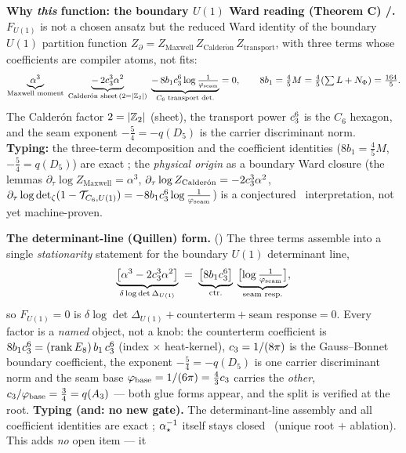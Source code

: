 \par\smallskip\noindent\textbf{Why \emph{this} function: the boundary $U(1)$ Ward reading (Theorem C) \mE/\mC.}
$F_{U(1)}$ is not a chosen ansatz but the reduced Ward identity of the boundary $U(1)$ partition function
$Z_{\partial}=Z_{\mathrm{Maxwell}}\,Z_{\mathrm{Calder\acute on}}\,Z_{\mathrm{transport}}$, with three terms
whose coefficients are compiler atoms, not fits:
\[
  \underbrace{\alpha^3}_{\text{Maxwell moment}}\;
  \underbrace{-\,2c_3^3\alpha^2}_{\text{Calder\'on sheet}\,(2=|\mathbb{Z}_2|)}\;
  \underbrace{-\,8b_1c_3^6\log\tfrac1{\varphi_{\mathrm{seam}}}}_{\text{$C_6$ transport det.}}=0,\qquad
  8b_1=\tfrac45 M=\tfrac45(\textstyle\sum L+N_\Phi)=\tfrac{164}{5}.
\]
The Calder\'on factor $2=|\mathbb{Z}_2|$ (sheet), the transport power $c_3^6$ is the $C_6$ hexagon, and the
seam exponent $-\tfrac54=-q(D_5)$ is the carrier discriminant norm. \textbf{Typing:} the three-term
decomposition and the coefficient identities ($8b_1=\tfrac45 M$, $-\tfrac54=q(D_5)$) are exact \mE; the
\emph{physical origin} as a boundary Ward closure (the lemmas $\partial_\tau\log Z_{\mathrm{Maxwell}}=\alpha^3$,
$\partial_\tau\log Z_{\mathrm{Calder\acute on}}=-2c_3^3\alpha^2$, $\partial_\tau\log\det\nolimits_\zeta(1-\mathcal T_{C_6,U(1)})=-8b_1c_3^6\log\tfrac1{\varphi_{\mathrm{seam}}}$)
is a conjectured \mC\ interpretation, not yet machine-proven. 
\par\smallskip
\noindent\textbf{The determinant-line (Quillen) form.} ()
The three terms assemble into a single \emph{stationarity} statement for the boundary $U(1)$ determinant line,
\[
  \underbrace{\bigl[\alpha^3-2c_3^3\alpha^2\bigr]}_{\delta\log\det\Delta_{U(1)}}
  \;=\;\underbrace{\bigl[8b_1c_3^6\bigr]}_{\text{ctr.}}\;
  \underbrace{\bigl[\log\tfrac1{\varphi_{\mathrm{seam}}}\bigr]}_{\text{seam resp.}},
\]
so $F_{U(1)}=0$ is $\delta\log\det\Delta_{U(1)}+\text{counterterm}+\text{seam response}=0$. Every factor is a
\emph{named} object, not a knob: the counterterm coefficient is $8b_1c_3^6=(\operatorname{rank}E_8)\,b_1\,c_3^6$
(index $\times$ heat-kernel), $c_3=1/(8\pi)$ is the Gauss--Bonnet boundary coefficient, the exponent
$-\tfrac54=-q(D_5)$ is one carrier discriminant norm and the seam base $\varphi_{\mathrm{base}}=1/(6\pi)=\tfrac43c_3$ carries
the \emph{other}, $c_3/\varphi_{\mathrm{base}}=\tfrac34=q(A_3)$ --- both glue forms appear, and the split is verified at the
root. \textbf{Typing (and: no new gate).} The determinant-line assembly and all coefficient identities are exact
\mE; $\alpha^{-1}_\star$ itself stays closed \mE\ (unique root $+$ ablation). This adds \emph{no} open item --- it
